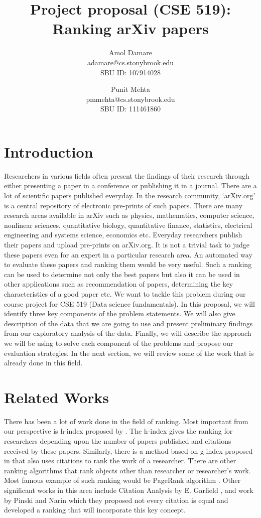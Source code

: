 \documentclass[a4paper, 11pt]{article}
\begin{document}
\title{Project proposal (CSE 519): Ranking arXiv papers}

\author{Amol Damare \\ adamare@cs.stonybrook.edu \\SBU ID: 107914028
\and
Punit Mehta \\  pmmehta@cs.stonybrook.edu \\SBU ID: 111461860}
\maketitle
\section{Introduction}
Researchers in various fields often present the findings of their research through either presenting a paper in a conference or publishing it in a journal. There are a lot of scientific papers published everyday. In the research community, `arXiv.org' is a central repository of electronic pre-prints of such papers. There are many research areas available in arXiv such as physics, mathematics, computer science, nonlinear sciences, quantitative biology, quantitative finance, statistics, electrical engineering and systems science, economics etc.  Everyday researchers publish their papers and upload pre-prints on arXiv.org.  It is not a trivial task to judge these papers even for an expert in a particular research area. An automated way to evaluate these papers and ranking them would be very useful. Such a ranking can be used to determine not only the best papers but also it can be used in other applications such as recommendation of papers, determining the key characteristics of a good paper etc. We want to tackle this problem during our course project for CSE 519 (Data science fundamentals). In this proposal, we will identify three key components of the problem statements. We will also give description of the data that we are going to use and present preliminary findings from our exploratory analysis of the data.  Finally, we will describe the approach we will be using to solve each component of the problems and propose our evaluation strategies. In the next section, we will review some of the work that is already done in this field.

\section{Related Works}
There has been a lot of work done in the field of ranking. Most important from our perspective is h-index proposed by \cite{Hirsch}. The h-index gives the ranking for researchers depending upon the number of papers published and citations received by these papers.
Similarly, there is a method based on g-index proposed in \cite{gindex} that also uses citations to rank the work of a researcher. There are other ranking algorithms that rank objects other than researcher or researcher's work. Most famous example of such ranking would be PageRank algorithm \cite{pagerank}. Other significant works in this area include Citation Analysis by E. Garfield \cite{garfield}, and work by Pinski and Narin \cite{pinski} which they proposed not every citation is equal and developed a ranking that will incorporate this key concept.
\end{document}
